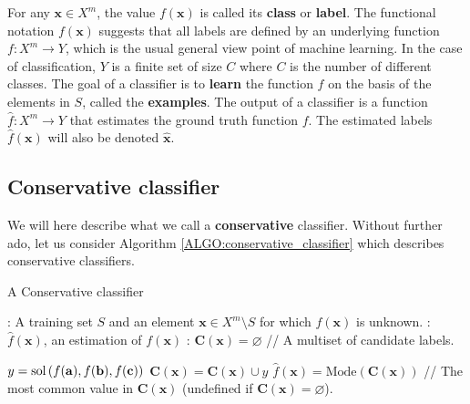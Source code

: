 For any $\mathbf{x} \in X^m$, the value $f(\mathbf{x})$ is called its
\textbf{class} or \textbf{label}.
The functional notation $f(\mathbf{x})$ suggests that all labels
are defined by an underlying function $f \colon X^m \to Y$, which is the usual
general view point of machine learning. In the case of classification, $Y$ is a
finite set of size $C$ where $C$ is the number of different classes. The goal
of a classifier is to \textbf{learn} the function $f$ on the basis of the
elements in $S$, called the \textbf{examples}. The output of a classifier is a
function $\hat{f} \colon X^m \to Y$ that estimates the ground truth function
$f$. The estimated labels $\hat{f}(\mathbf{x})$ will also be denoted
$\hat{\mathbf{x}}$.

\subsection{Conservative classifier}
\label{SEC:conservative_classifier}

We will here describe what we call a \textbf{conservative} classifier. Without
further ado, let us consider Algorithm \ref{ALGO:conservative_classifier} which
describes conservative classifiers.

\begin{algorithm}[!ht]
\caption{A Conservative classifier}
\label{ALGO:conservative_classifier}
  \begin{algorithmic}
    : A training set $S$ and an element $\mathbf{x} \in X^m
    \setminus S$ for which $f(\mathbf{x})$ is unknown.
    : $\hat{f}(\mathbf{x})$, an estimation of
    $f(\mathbf{x})$
    : $\mathbf{C}(\mathbf{x}) = \varnothing$ \quad \quad // A multiset of candidate
    labels.

    \STATE $y = \text{sol}\left(f(\mathbf{a}), f(\mathbf{b}), f(\mathbf{c})\right)$
    \STATE $ \mathbf{C}(\mathbf{x}) = \mathbf{C}(\mathbf{x}) \cup y$
    \ENDIF
	  \ENDFOR
    \STATE $\hat{f}(\mathbf{x}) = \text{Mode} (\mathbf{C}(\mathbf{x}))$ // The most common value in
    $\mathbf{C}(\mathbf{x})$ (undefined if $\mathbf{C}(\mathbf{x}) = \varnothing$).
  \end{algorithmic}
\end{algorithm}

